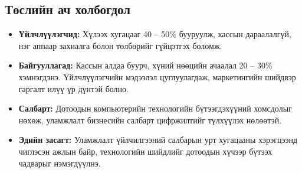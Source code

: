 \subsection{Төслийн ач холбогдол}

\begin{itemize}
  \item \textbf{Үйлчлүүлэгчид:} Хүлээх хугацааг 40 -- 50\% бууруулж,
        кассын дараалалгүй, нэг аппаар захиалга болон төлбөрийг
        гүйцэтгэх боломж.
  \item \textbf{Байгууллагад:} Кассын алдаа буурч, хүний нөөцийн
        ачаалал 20 -- 30\% хэмнэгдэнэ. Үйлчлүүлэгчийн мэдээлэл
        цуглуулагдаж, маркетингийн шийдвэр гаргалт илүү үр дүнтэй
        болно.
  \item \textbf{Салбарт:} Дотоодын компьютерийн технологийн
        бүтээгдэхүүний хомсдолыг нөхөж, уламжлалт бизнесийн салбарт
        цифржилтийг түлхүүлэх нөлөөтэй.
  \item \textbf{Эдийн засагт:} Уламжлалт үйлчилгээний салбарын
        урт хугацааны хэрэгцээнд чиглэсэн ажлын байр, технологийн
        шийдлийг дотоодын хүчээр бүтээх чадварыг нэмэгдүүлнэ.
\end{itemize}
